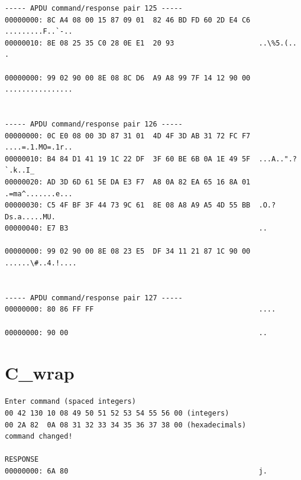 \documentclass[bsc,frontabs,twoside,singlespacing,parskip,deptreport]{infthesis}     %
\begin{document}
\begin{appendices}
\begin{Verbatim}[commandchars=\\\{\}, fontsize=\small]
----- APDU command/response pair 125 -----
00000000: 8C A4 08 00 15 87 09 01  82 46 BD FD 60 2D E4 C6  .........F..`-..
00000010: 8E 08 25 35 C0 28 0E E1  20 93                    ..\%5.(.. .

00000000: 99 02 90 00 8E 08 8C D6  A9 A8 99 7F 14 12 90 00  ................


----- APDU command/response pair 126 -----
00000000: 0C E0 08 00 3D 87 31 01  4D 4F 3D AB 31 72 FC F7  ....=.1.MO=.1r..
00000010: B4 84 D1 41 19 1C 22 DF  3F 60 BE 6B 0A 1E 49 5F  ...A..".?`.k..I_
00000020: AD 3D 6D 61 5E DA E3 F7  A8 0A 82 EA 65 16 8A 01  .=ma^.......e...
00000030: C5 4F BF 3F 44 73 9C 61  8E 08 A8 A9 A5 4D 55 BB  .O.?Ds.a.....MU.
00000040: E7 B3                                             ..

00000000: 99 02 90 00 8E 08 23 E5  DF 34 11 21 87 1C 90 00  ......\#..4.!....


----- APDU command/response pair 127 -----
00000000: 80 86 FF FF                                       ....

00000000: 90 00                                             ..

\end{Verbatim}

\section{C\_wrap}
\begin{Verbatim}[commandchars=\\\{\}, fontsize=\small]
Enter command (spaced integers)
00 42 130 10 08 49 50 51 52 53 54 55 56 00 (integers)
00 2A 82  0A 08 31 32 33 34 35 36 37 38 00 (hexadecimals)
command changed!

RESPONSE
00000000: 6A 80                                             j.
\end{Verbatim}

\end{appendices} 
\end{document}
